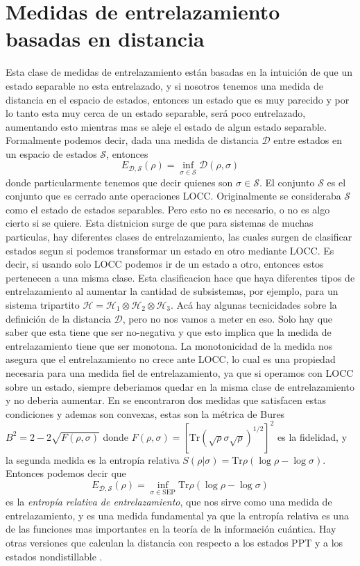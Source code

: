 \section{Medidas de entrelazamiento basadas en distancia}
Esta clase de medidas de entrelazamiento están basadas en la intuición de que un estado separable no esta entrelazado, y si nosotros tenemos una medida de distancia en el espacio de estados, entonces un estado que es muy parecido y por lo tanto esta muy cerca de un estado separable, será poco entrelazado, aumentando esto mientras mas se aleje el estado de algun estado separable. Formalmente podemos decir, dada una medida de distancia $\mathcal{D}$ entre estados en un espacio de estados $\mathcal{S}$, entonces
\begin{equation}
    E_{\mathcal{D},\mathcal{S}}(\rho)=\inf_{\sigma\in\mathcal{S}}\mathcal{D}(\rho,\sigma)
\end{equation}
donde particularmente tenemos que decir quienes son $\sigma\in\mathcal{S}$. El conjunto $\mathcal{S}$ es el conjunto que es cerrado ante operaciones LOCC. Originalmente se consideraba $\mathcal{S}$ como el estado de estados separables. Pero esto no es necesario, o no es algo cierto si se quiere. Esta distnicion surge de que para sistemas de muchas particulas, hay diferentes clases de entrelazamiento, las cuales surgen de clasificar estados segun si podemos transformar un estado en otro mediante LOCC. Es decir, si usando solo LOCC podemos ir de un estado a otro, entonces estos pertenecen a una misma clase. Esta clasificacion hace que haya diferentes tipos de entrelazamiento al aumentar la cantidad de subsistemas, por ejemplo, para un sistema tripartito $\mathcal{H}=\mathcal{H}_1\otimes\mathcal{H}_2\otimes\mathcal{H}_3$. Acá hay algunas tecnicidades sobre la definición de la distancia $\mathcal{D}$, pero no nos vamos a meter en eso. Solo hay que saber que esta tiene que ser no-negativa y que esto implica que la medida de entrelazamiento tiene que ser monotona. La monotonicidad de la medida nos asegura que el entrelazamiento no crece ante LOCC, lo cual es una propiedad necesaria para una medida fiel de entrelazamiento, ya que si operamos con LOCC sobre un estado, siempre deberiamos quedar en la misma clase de entrelazamiento y no deberia aumentar. En \cite{verdalplenio1998} se encontraron dos medidas que satisfacen estas condiciones y ademas son convexas, estas son la métrica de Bures $B^2=2-2\sqrt{F(\rho,\sigma)}$ donde $F(\rho,\sigma)=[\text{Tr}(\sqrt{\rho}\sigma\sqrt{\rho})^{1/2}]^2$ es la fidelidad, y la segunda medida es la entropía relativa $S(\rho|\sigma)=\text{Tr}\rho(\log\rho-\log\sigma)$. Entonces podemos decir que 
\begin{equation}
     E_{\mathcal{D},\mathcal{S}}(\rho)=\inf_{\sigma\in\text{SEP}}\text{Tr}\rho(\log\rho-\log\sigma)
\end{equation}
es la \textit{entropía relativa de entrelazamiento}, que nos sirve como una medida de entrelazamiento, y es una medida fundamental ya que la entropía relativa es una de las funciones mas importantes en la teoría de la información cuántica. Hay otras versiones que calculan la distancia con respecto a los estados PPT \cite{Rains2000} y a los estados nondistillable \cite{Vedral1998}.

